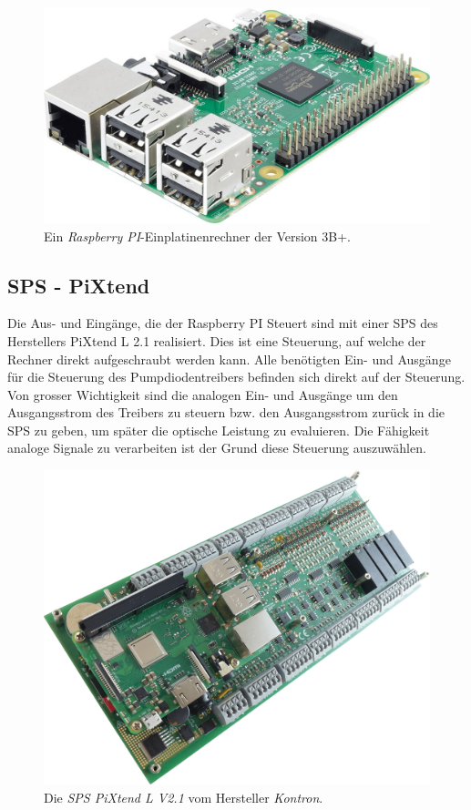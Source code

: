 \begin{figure}[H]
    \centering
    \includegraphics[scale=0.25]{98_images/raspberry_pi_version_3_b.jpg}
    \caption{Ein \textit{Raspberry PI}-Einplatinenrechner der Version  3B+.}
    \label{fig:raspberry_pi_3b+}
\end{figure}

\subsection{SPS - PiXtend}
Die Aus- und Eingänge, die der Raspberry PI Steuert sind mit einer SPS des Herstellers PiXtend L 2.1 realisiert. Dies ist eine Steuerung, auf welche der Rechner direkt aufgeschraubt werden kann. Alle benötigten Ein- und Ausgänge für die Steuerung des Pumpdiodentreibers befinden sich direkt auf der Steuerung. Von grosser Wichtigkeit sind die analogen Ein- und Ausgänge um den Ausgangsstrom des Treibers zu steuern bzw. den Ausgangsstrom zurück in die SPS zu geben, um später die optische Leistung zu evaluieren. Die Fähigkeit analoge Signale zu verarbeiten ist der Grund diese Steuerung auszuwählen.

\begin{figure}[H]
    \centering
    \includegraphics[scale=0.08]{98_images/pixtend_l_basic.png}
    \caption{Die \textit{SPS PiXtend L V2.1} vom Hersteller \textit{Kontron}.}
    \label{fig:sps_pixtend_hw}
\end{figure}

